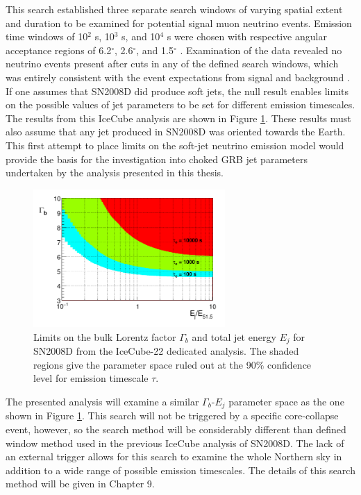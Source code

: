\documentclass{gatech-thesis}
\begin{document}
This search established three separate search windows of varying spatial extent and duration to be examined for potential signal muon neutrino events. Emission time windows of 10$^2$ s, 10$^3$ s, and 10$^4$ s were chosen with respective angular acceptance regions of 6.2$^{\circ}$, 2.6$^{\circ}$, and 1.5$^{\circ}$ \cite{2011A&A...527A..28I}. Examination of the data revealed no neutrino events present after cuts in any of the defined search windows, which was entirely consistent with the event expectations from signal and background \cite{2011A&A...527A..28I}. If one assumes that SN2008D did produce soft jets, the null result enables limits on the possible values of jet parameters to be set for different emission timescales. The results from this IceCube analysis are shown in Figure \ref{fig:SN2008D}. These results must also assume that any jet produced in SN2008D was oriented towards the Earth. This first attempt to place limits on the soft-jet neutrino emission model would provide the basis for the investigation into choked GRB jet parameters undertaken by the analysis presented in this thesis.
\begin{figure}[ht]
  \begin{center}
    \includegraphics[width=0.65\textwidth,keepaspectratio]{SN2008D_ICLimits.png}
  \end{center}
  \caption[IceCube-22 Limits on SN2008D]{Limits on the bulk Lorentz factor $\Gamma_b$ and total jet energy $E_j$ for SN2008D from the IceCube-22 dedicated analysis. The shaded regions give the parameter space ruled out at the 90$\%$ confidence level for emission timescale $\tau$.}
  \label{fig:SN2008D}
\end{figure}
The presented analysis will examine a similar $\Gamma_b$-$E_j$ parameter space as the one shown in Figure \ref{fig:SN2008D}. This search will not be triggered by a specific core-collapse event, however, so the search method will be considerably different than defined window method used in the previous IceCube analysis of SN2008D. The lack of an external trigger allows for this search to examine the whole Northern sky in addition to a wide range of possible emission timescales. The details of this search method will be given in Chapter 9.
\end{document}
